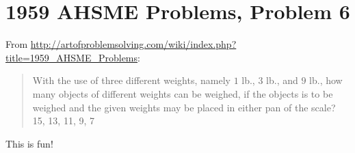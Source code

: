 \section{1959 AHSME Problems, Problem 6}

From \url{http://artofproblemsolving.com/wiki/index.php?title=1959_AHSME_Problems}:

\begin{framed}
\begin{quotation}

With the use of three different weights, namely $1$ lb., $3$ lb., and $9$ lb., 
how many objects of different weights can be weighed, if the objects is to be weighed 
and the given weights may be placed in either pan of the scale? 
15, 13, 11, 9, 7

\end{quotation}
\end{framed}

This is fun!

